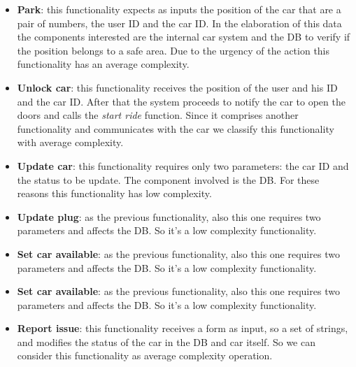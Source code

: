 \documentclass[english]{article}
\begin{document}
\begin{itemize}
	\item{\textbf{Park}: this functionality expects as inputs the position of the car that are a pair of numbers, the user ID and the car ID. In the elaboration of this data the components interested are the internal car system and the DB to verify if the position belongs to a safe area. Due to the urgency of the action this functionality has an average complexity.}

	\item{\textbf{Unlock car}: this functionality receives the position of the user and his ID and the car ID. After that the system proceeds to notify the car to open the doors and calls the \textit{start ride} function. Since it comprises another functionality and communicates with the car we classify this functionality with average complexity.}

	\item{\textbf{Update car}: this functionality requires only two parameters: the car ID and the status to be update. The component involved is the DB. For these reasons this functionality has low complexity.}

	\item{\textbf{Update plug}: as the previous functionality, also this one requires two parameters and affects the DB. So it's a low complexity functionality.}

	\item{\textbf{Set car available}: as the previous functionality, also this one requires two parameters and affects the DB. So it's a low complexity functionality.}

	\item{\textbf{Set car available}: as the previous functionality, also this one requires two parameters and affects the DB. So it's a low complexity functionality.}

	\item{\textbf{Report issue}: this functionality receives a form as input, so a set of strings, and modifies the status of the car in the DB and car itself. So we can consider this functionality as average complexity operation.}
\end{itemize}
\end{document}
